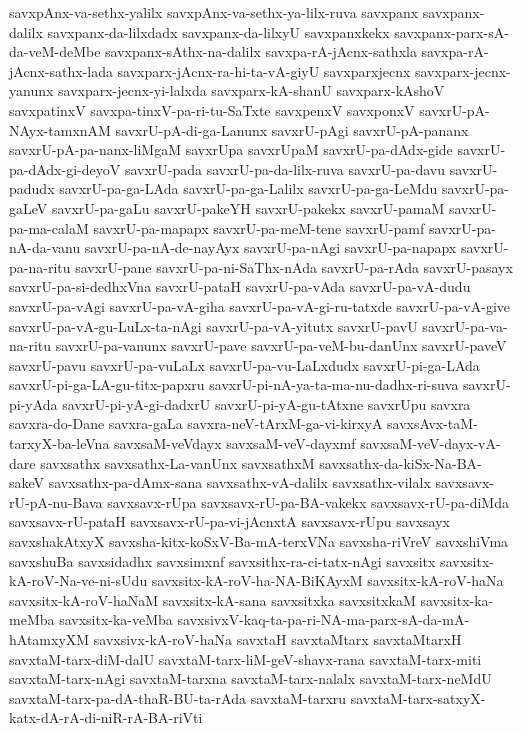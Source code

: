 {savxpAnx-va-sethx-yalilx
savxpAnx-va-sethx-ya-lilx-ruva
savxpanx
savxpanx-dalilx
savxpanx-da-lilxdadx
savxpanx-da-lilxyU
savxpanxkekx
savxpanx-parx-sA-da-veM-deMbe
savxpanx-sAthx-na-dalilx
savxpa-rA-jAcnx-sathxla
savxpa-rA-jAcnx-sathx-lada
savxparx-jAcnx-ra-hi-ta-vA-giyU
savxparxjecnx
savxparx-jecnx-yanunx
savxparx-jecnx-yi-lalxda
savxparx-kA-shanU
savxparx-kAshoV
savxpatinxV
savxpa-tinxV-pa-ri-tu-SaTxte
savxpenxV
savxponxV
savxrU-pA-NAyx-tamxnAM
savxrU-pA-di-ga-Lanunx
savxrU-pAgi
savxrU-pA-pananx
savxrU-pA-pa-nanx-liMgaM
savxrUpa
savxrUpaM
savxrU-pa-dAdx-gide
savxrU-pa-dAdx-gi-deyoV
savxrU-pada
savxrU-pa-da-lilx-ruva
savxrU-pa-davu
savxrU-padudx
savxrU-pa-ga-LAda
savxrU-pa-ga-Lalilx
savxrU-pa-ga-LeMdu
savxrU-pa-gaLeV
savxrU-pa-gaLu
savxrU-pakeYH
savxrU-pakekx
savxrU-pamaM
savxrU-pa-ma-calaM
savxrU-pa-mapapx
savxrU-pa-meM-tene
savxrU-pamf
savxrU-pa-nA-da-vanu
savxrU-pa-nA-de-nayAyx
savxrU-pa-nAgi
savxrU-pa-napapx
savxrU-pa-na-ritu
savxrU-pane
savxrU-pa-ni-SaThx-nAda
savxrU-pa-rAda
savxrU-pasayx
savxrU-pa-si-dedhxVna
savxrU-pataH
savxrU-pa-vAda
savxrU-pa-vA-dudu
savxrU-pa-vAgi
savxrU-pa-vA-giha
savxrU-pa-vA-gi-ru-tatxde
savxrU-pa-vA-give
savxrU-pa-vA-gu-LuLx-ta-nAgi
savxrU-pa-vA-yitutx
savxrU-pavU
savxrU-pa-va-na-ritu
savxrU-pa-vanunx
savxrU-pave
savxrU-pa-veM-bu-danUnx
savxrU-paveV
savxrU-pavu
savxrU-pa-vuLaLx
savxrU-pa-vu-LaLxdudx
savxrU-pi-ga-LAda
savxrU-pi-ga-LA-gu-titx-papxru
savxrU-pi-nA-ya-ta-ma-nu-dadhx-ri-suva
savxrU-pi-yAda
savxrU-pi-yA-gi-dadxrU
savxrU-pi-yA-gu-tAtxne
savxrUpu
savxra
savxra-do-Dane
savxra-gaLa
savxra-neV-tArxM-ga-vi-kirxyA
savxsAvx-taM-tarxyX-ba-leVna
savxsaM-veVdayx
savxsaM-veV-dayxmf
savxsaM-veV-dayx-vA-dare
savxsathx
savxsathx-La-vanUnx
savxsathxM
savxsathx-da-kiSx-Na-BA-sakeV
savxsathx-pa-dAmx-sana
savxsathx-vA-dalilx
savxsathx-vilalx
savxsavx-rU-pA-nu-Bava
savxsavx-rUpa
savxsavx-rU-pa-BA-vakekx
savxsavx-rU-pa-diMda
savxsavx-rU-pataH
savxsavx-rU-pa-vi-jAcnxtA
savxsavx-rUpu
savxsayx
savxshakAtxyX
savxsha-kitx-koSxV-Ba-mA-terxVNa
savxsha-riVreV
savxshiVma
savxshuBa
savxsidadhx
savxsimxnf
savxsithx-ra-ci-tatx-nAgi
savxsitx
savxsitx-kA-roV-Na-ve-ni-sUdu
savxsitx-kA-roV-ha-NA-BiKAyxM
savxsitx-kA-roV-haNa
savxsitx-kA-roV-haNaM
savxsitx-kA-sana
savxsitxka
savxsitxkaM
savxsitx-ka-meMba
savxsitx-ka-veMba
savxsivxV-kaq-ta-pa-ri-NA-ma-parx-sA-da-mA-hAtamxyXM
savxsivx-kA-roV-haNa
savxtaH
savxtaMtarx
savxtaMtarxH
savxtaM-tarx-diM-dalU
savxtaM-tarx-liM-geV-shavx-rana
savxtaM-tarx-miti
savxtaM-tarx-nAgi
savxtaM-tarxna
savxtaM-tarx-nalalx
savxtaM-tarx-neMdU
savxtaM-tarx-pa-dA-thaR-BU-ta-rAda
savxtaM-tarxru
savxtaM-tarx-satxyX-katx-dA-rA-di-niR-rA-BA-riVti
}
